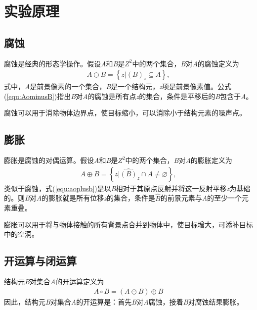 \documentclass{hitreport}
\begin{document}
\section{实验原理}

\subsection{腐蚀}\label{sec:corrosion}

腐蚀是经典的形态学操作。假设\textit{A}和\textit{B}是$Z^2$中的两个集合，\textit{B}对\textit{A}的腐蚀定义为
\begin{align}\label{equ:AominusB}
A\ominus B = \left\{z | \left(B\right)_z\subseteq A\right\},
\end{align}
式中，\textit{A}是前景像素的一个集合，\textit{B}是一个结构元，\textit{z}项是前景像素值。公式(\ref{equ:AominusB})指出\textit{B}对\textit{A}的腐蚀是所有点\textit{z}的集合，条件是平移后的\textit{B}包含于\textit{A}。

腐蚀可以用于消除物体边界点，使目标缩小，可以消除小于结构元素的噪声点。

\subsection{膨胀}\label{sec:swell}

膨胀是腐蚀的对偶运算。假设\textit{A}和\textit{B}是$Z^2$中的两个集合，\textit{B}对\textit{A}的膨胀定义为
\begin{align}\label{equ:aoplusb}
A\oplus B = \left\{z | \hat{\left(B\right)}_z \cap A \ne \varnothing \right\},
\end{align}
类似于腐蚀，式(\ref{equ:aoplusb})是以\textit{B}相对于其原点反射并将这一反射平移\textit{z}为基础的。则\textit{B}对\textit{A}的膨胀就是所有位移\textit{z}的集合，条件是$\hat{B}$的前景元素与\textit{A}的至少一个元素重叠。

膨胀可以用于将与物体接触的所有背景点合并到物体中，使目标增大，可添补目标中的空洞。


\subsection{开运算与闭运算}\label{sec:openclose}

结构元\textit{B}对集合\textit{A}的开运算定义为
\begin{align}
A \circ B = \left(A\ominus B\right)\oplus B
\end{align}
因此，结构元\textit{B}对集合\textit{A}的开运算是：首先\textit{B}对\textit{A}腐蚀，接着\textit{B}对腐蚀结果膨胀。
\end{document}
